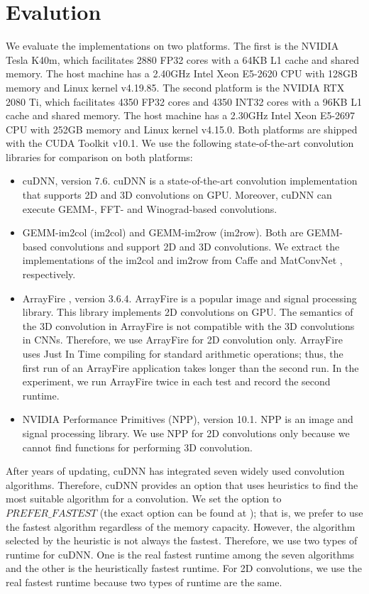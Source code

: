 \section{Evalution}
\label{exp}
We evaluate the implementations on two platforms. The first is the  NVIDIA Tesla K40m, which facilitates 2880 FP32 cores with a 64KB L1 cache and
shared memory. The host machine has a 2.40GHz Intel Xeon E5-2620 CPU with 128GB memory and Linux kernel v4.19.85. The second platform is the NVIDIA RTX 2080 Ti, which facilitates 4350 FP32 cores and 4350 INT32 cores with a 96KB L1 cache and shared memory. The host machine has a 2.30GHz Intel Xeon E5-2697
CPU with 252GB memory and Linux kernel v4.15.0. Both platforms are shipped with the CUDA Toolkit v10.1. We use the following state-of-the-art convolution libraries for comparison on both platforms:
\begin{itemize}
  \item cuDNN, version 7.6. cuDNN is a state-of-the-art convolution implementation that supports 2D and 3D convolutions on GPU.
      Moreover, cuDNN can execute GEMM-, FFT- and Winograd-based convolutions.
  \item GEMM-im2col (im2col) and GEMM-im2row (im2row). Both are GEMM-based convolutions and support 2D and 3D convolutions.
      We extract the implementations of the im2col and im2row from Caffe \cite{jia2014caffe} and MatConvNet \cite{vedaldi15matconvnet}, respectively.
  \item ArrayFire \cite{Yalamanchili2015}, version 3.6.4. ArrayFire is a popular image and signal processing library. This library implements 2D convolutions on GPU. The semantics of the 3D convolution in ArrayFire is not compatible with the 3D
      convolutions in CNNs. Therefore, we use ArrayFire for 2D convolution only. ArrayFire uses Just In Time compiling for standard arithmetic operations; thus, the first run of an ArrayFire application takes longer than the second run.
      In the experiment, we run ArrayFire twice in each test and record the second runtime.
  \item NVIDIA Performance Primitives (NPP), version 10.1. NPP is an image and signal processing library. We use NPP for 2D convolutions only because we cannot find functions for performing 3D convolution.

\end{itemize}

After years of updating, cuDNN has integrated seven widely used convolution algorithms. Therefore, cuDNN provides an option that uses
heuristics to find the most suitable algorithm for a convolution. We set the option to $PREFER\_FASTEST$ (the exact option can be found at
\cite{CUDAtoolkit}); that is, we prefer to use the fastest algorithm regardless of the memory capacity. However, the algorithm
selected by the heuristic is not always the fastest. Therefore, we use two types of runtime for cuDNN. One is the real fastest runtime
among the seven algorithms and the other is the heuristically fastest runtime. For 2D convolutions, we use the real fastest runtime because two types of runtime are the same.

